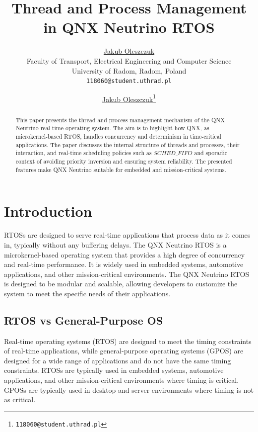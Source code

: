 \documentclass{article}
\title{Thread and Process Management in QNX Neutrino RTOS}
\date{}
\author{ 
	\href{https://orcid.org/0009-0000-3709-0802}{Jakub Oleszczuk} \\ %
	Faculty of Transport, Electrical Engineering and Computer Science\\
	University of Radom, Radom, Poland \\
	\texttt{118060@student.uthrad.pl} \\
}
\author[1]{%
	\href{https://orcid.org/0009-0000-3709-0802}{\usebox{\orcid}\hspace{1mm}Jakub Oleszczuk\thanks{\texttt{118060@student.uthrad.pl}}}%
}
\affil[1]{Faculty of Transport, Electrical Engineering and Computer Science, University of Radom, Radom,26-600, Poland}
\begin{document}
\maketitle

\begin{abstract}
	\label{sec:abstract}
	This paper presents the thread and process management mechanism of the QNX Neutrino real-time operating system.
	The aim is to highlight how QNX, as microkernel-based RTOS, handles concurrency and determinism in time-critical applications.
	The paper discusses the internal structure of threads and processes, their interaction, and real-time scheduling policies such as $SCHED\_FIFO$
	and sporadic context of avoiding priority inversion and ensuring system reliability. The presented features make QNX Neutrino suitable for
	embedded and mission-critical systems.
\end{abstract}




\section{Introduction}
\label{sec:intro}
RTOSs are designed to serve real-time applications that process data as it comes in, typically without any buffering delays.
The QNX Neutrino RTOS \cite{WhatsRTOS2024} is a microkernel-based operating system that provides a high degree of concurrency and real-time performance.
It is widely used in embedded systems, automotive applications, and other mission-critical environments.
The QNX Neutrino RTOS is designed to be modular and scalable, allowing developers to customize the system to meet the specific needs of their applications.
\FloatBarrier
\subsection{RTOS vs General-Purpose OS}
\label{sec:rtos-vs-gpos}
Real-time operating systems (RTOS) are designed to meet the timing constraints of real-time applications, while general-purpose operating systems (GPOS) are designed for a wide range of applications and do not have the same timing constraints.
RTOSs are typically used in embedded systems, automotive applications, and other mission-critical environments where timing is critical.
GPOSs are typically used in desktop and server environments where timing is not as critical.\cite{WhatsRTOS2024}
\end{document}
